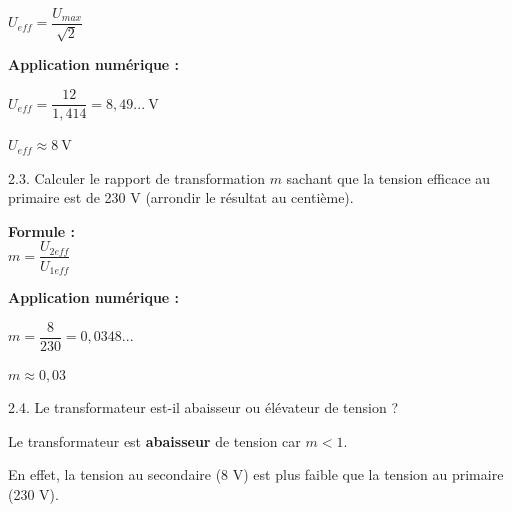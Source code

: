 \documentclass[11pt,a4paper]{article}
\begin{document}
\begin{enumerate}
\begin{minipage}{.55\textwidth}
\begin{tcolorbox}[colback=red!5!white,colframe=red!75!black]
$U_{eff} = \dfrac{U_{max}}{\sqrt{2}}$

\vspace{2mm}

\textbf{Application numérique :}

$U_{eff} = \dfrac{12}{1,414} = 8,49...~\text{V}$

\vspace{2mm}

$U_{eff} \approx \boxed{8~\text{V}}$
\end{tcolorbox}
\end{minipage}%
\hfill
\begin{minipage}{.35\textwidth}%
\centering
\osci[%
scale=0.5,
second channel=0,
screen offset one=0,
screen offset two=0,
time div=5,
voltage div one=5,
voltage div two=2,
sample rate=200,
xy mode=0,
func one=12*sin(2*180/0.020*x),
func two=3*sin(2*180/0.020*x+180),
color one=D62626,
color two=1053AF,
graph back color=FFFFFF,
info back color=D6D6D6,
info text color=000000,
main axis color=000000,
grid color=CCCCCC
]

\end{minipage}%

\end{enumerate}

\newpage 

2.3. Calculer le rapport de transformation $m$ sachant que la tension efficace au primaire est de 230 V (arrondir le résultat au centième). 

\begin{tcolorbox}[colback=red!5!white,colframe=red!75!black]
\begin{multicols}{2}

\textbf{Formule :}\\[2mm]

$m = \dfrac{U_{2eff}}{U_{1eff}}$

\columnbreak

\textbf{Application numérique :}

$m = \dfrac{8}{230} = 0,0348...$

\vspace{3mm}

$m \approx \boxed{0,03}$
\end{multicols}
\end{tcolorbox}

2.4. Le transformateur est-il abaisseur ou élévateur de tension ?
\vspace{5mm}

\begin{tcolorbox}[colback=red!5!white,colframe=red!75!black]
Le transformateur est \textbf{abaisseur} de tension car $m < 1$.

\vspace{2mm}

En effet, la tension au secondaire (8 V) est plus faible que la tension au primaire (230 V).
\end{tcolorbox}
\end{document}
